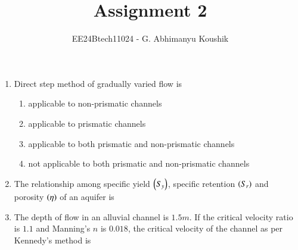 \documentclass[journal,12pt,onecolumn]{IEEEtran}
\theoremstyle{remark}
\begin{document}
\title{Assignment 2}
\author{EE24Btech11024 - G. Abhimanyu Koushik}
\maketitle
\renewcommand{\thefigure}{\theenumi}
\renewcommand{\thetable}{\theenumi}
\begin{enumerate}

\item Direct step method of gradually varied flow is

\hfill{}
\begin{enumerate}
\item applicable to non-prismatic channels
\item applicable to prismatic channels
\item applicable to both prismatic and non-prismatic channels
\item not applicable to both prismatic and non-prismatic channels
\end{enumerate}

\item The relationship among specific yield $\left(S_y\right)$, specific retention $\left(S_r\right)$ and porosity $\left(\eta\right)$ of an aquifer is

\hfill{}
\begin{enumerate}
\end{enumerate}

\item The depth of flow in an alluvial channel is $1.5m$. If the critical velocity ratio is $1.1$ and Manning's $n$ is $0.018$, the critical velocity of the channel as per Kennedy's method is

\hfill{}
\begin{enumerate}
\end{enumerate}


\end{enumerate}
\end{document}
